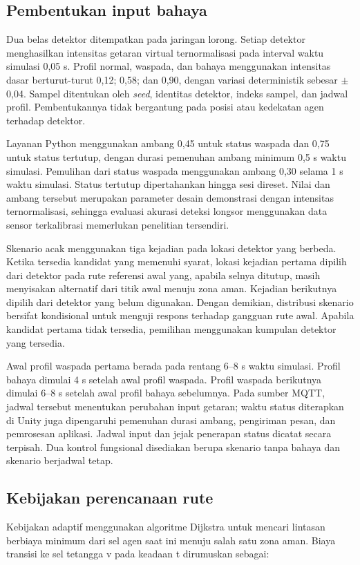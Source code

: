 \documentclass[10pt,a4paper]{article}
\begin{document}
\subsection*{Pembentukan input bahaya}
Dua belas detektor ditempatkan pada jaringan lorong. Setiap detektor menghasilkan intensitas getaran virtual ternormalisasi pada interval waktu simulasi 0,05 s. Profil normal, waspada, dan bahaya menggunakan intensitas dasar berturut-turut 0,12; 0,58; dan 0,90, dengan variasi deterministik sebesar $\pm$0,04. Sampel ditentukan oleh \emph{seed}, identitas detektor, indeks sampel, dan jadwal profil. Pembentukannya tidak bergantung pada posisi atau kedekatan agen terhadap detektor.

Layanan Python menggunakan ambang 0,45 untuk status waspada dan 0,75 untuk status tertutup, dengan durasi pemenuhan ambang minimum 0,5 s waktu simulasi. Pemulihan dari status waspada menggunakan ambang 0,30 selama 1 s waktu simulasi. Status tertutup dipertahankan hingga sesi direset. Nilai dan ambang tersebut merupakan parameter desain demonstrasi dengan intensitas ternormalisasi, sehingga evaluasi akurasi deteksi longsor menggunakan data sensor terkalibrasi memerlukan penelitian tersendiri.

Skenario acak menggunakan tiga kejadian pada lokasi detektor yang berbeda. Ketika tersedia kandidat yang memenuhi syarat, lokasi kejadian pertama dipilih dari detektor pada rute referensi awal yang, apabila selnya ditutup, masih menyisakan alternatif dari titik awal menuju zona aman. Kejadian berikutnya dipilih dari detektor yang belum digunakan. Dengan demikian, distribusi skenario bersifat kondisional untuk menguji respons terhadap gangguan rute awal. Apabila kandidat pertama tidak tersedia, pemilihan menggunakan kumpulan detektor yang tersedia.

Awal profil waspada pertama berada pada rentang 6--8 s waktu simulasi. Profil bahaya dimulai 4 s setelah awal profil waspada. Profil waspada berikutnya dimulai 6--8 s setelah awal profil bahaya sebelumnya. Pada sumber MQTT, jadwal tersebut menentukan perubahan input getaran; waktu status diterapkan di Unity juga dipengaruhi pemenuhan durasi ambang, pengiriman pesan, dan pemrosesan aplikasi. Jadwal input dan jejak penerapan status dicatat secara terpisah. Dua kontrol fungsional disediakan berupa skenario tanpa bahaya dan skenario berjadwal tetap.

\subsection*{Kebijakan perencanaan rute}
Kebijakan adaptif menggunakan algoritme Dijkstra \cite{haam} untuk mencari lintasan berbiaya minimum dari sel agen saat ini menuju salah satu zona aman. Biaya transisi ke sel tetangga v pada keadaan t dirumuskan sebagai:
\end{document}
